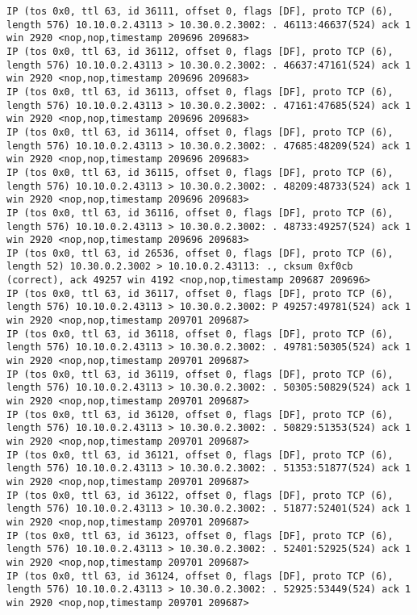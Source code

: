 \documentclass[a4paper,12pt]{article}
\begin{document}
\begin{lstlisting}
IP (tos 0x0, ttl 63, id 36111, offset 0, flags [DF], proto TCP (6), length 576) 10.10.0.2.43113 > 10.30.0.2.3002: . 46113:46637(524) ack 1 win 2920 <nop,nop,timestamp 209696 209683>
IP (tos 0x0, ttl 63, id 36112, offset 0, flags [DF], proto TCP (6), length 576) 10.10.0.2.43113 > 10.30.0.2.3002: . 46637:47161(524) ack 1 win 2920 <nop,nop,timestamp 209696 209683>
IP (tos 0x0, ttl 63, id 36113, offset 0, flags [DF], proto TCP (6), length 576) 10.10.0.2.43113 > 10.30.0.2.3002: . 47161:47685(524) ack 1 win 2920 <nop,nop,timestamp 209696 209683>
IP (tos 0x0, ttl 63, id 36114, offset 0, flags [DF], proto TCP (6), length 576) 10.10.0.2.43113 > 10.30.0.2.3002: . 47685:48209(524) ack 1 win 2920 <nop,nop,timestamp 209696 209683>
IP (tos 0x0, ttl 63, id 36115, offset 0, flags [DF], proto TCP (6), length 576) 10.10.0.2.43113 > 10.30.0.2.3002: . 48209:48733(524) ack 1 win 2920 <nop,nop,timestamp 209696 209683>
IP (tos 0x0, ttl 63, id 36116, offset 0, flags [DF], proto TCP (6), length 576) 10.10.0.2.43113 > 10.30.0.2.3002: . 48733:49257(524) ack 1 win 2920 <nop,nop,timestamp 209696 209683>
IP (tos 0x0, ttl 63, id 26536, offset 0, flags [DF], proto TCP (6), length 52) 10.30.0.2.3002 > 10.10.0.2.43113: ., cksum 0xf0cb (correct), ack 49257 win 4192 <nop,nop,timestamp 209687 209696>
IP (tos 0x0, ttl 63, id 36117, offset 0, flags [DF], proto TCP (6), length 576) 10.10.0.2.43113 > 10.30.0.2.3002: P 49257:49781(524) ack 1 win 2920 <nop,nop,timestamp 209701 209687>
IP (tos 0x0, ttl 63, id 36118, offset 0, flags [DF], proto TCP (6), length 576) 10.10.0.2.43113 > 10.30.0.2.3002: . 49781:50305(524) ack 1 win 2920 <nop,nop,timestamp 209701 209687>
IP (tos 0x0, ttl 63, id 36119, offset 0, flags [DF], proto TCP (6), length 576) 10.10.0.2.43113 > 10.30.0.2.3002: . 50305:50829(524) ack 1 win 2920 <nop,nop,timestamp 209701 209687>
IP (tos 0x0, ttl 63, id 36120, offset 0, flags [DF], proto TCP (6), length 576) 10.10.0.2.43113 > 10.30.0.2.3002: . 50829:51353(524) ack 1 win 2920 <nop,nop,timestamp 209701 209687>
IP (tos 0x0, ttl 63, id 36121, offset 0, flags [DF], proto TCP (6), length 576) 10.10.0.2.43113 > 10.30.0.2.3002: . 51353:51877(524) ack 1 win 2920 <nop,nop,timestamp 209701 209687>
IP (tos 0x0, ttl 63, id 36122, offset 0, flags [DF], proto TCP (6), length 576) 10.10.0.2.43113 > 10.30.0.2.3002: . 51877:52401(524) ack 1 win 2920 <nop,nop,timestamp 209701 209687>
IP (tos 0x0, ttl 63, id 36123, offset 0, flags [DF], proto TCP (6), length 576) 10.10.0.2.43113 > 10.30.0.2.3002: . 52401:52925(524) ack 1 win 2920 <nop,nop,timestamp 209701 209687>
IP (tos 0x0, ttl 63, id 36124, offset 0, flags [DF], proto TCP (6), length 576) 10.10.0.2.43113 > 10.30.0.2.3002: . 52925:53449(524) ack 1 win 2920 <nop,nop,timestamp 209701 209687>

\end{lstlisting}
\end{document}
